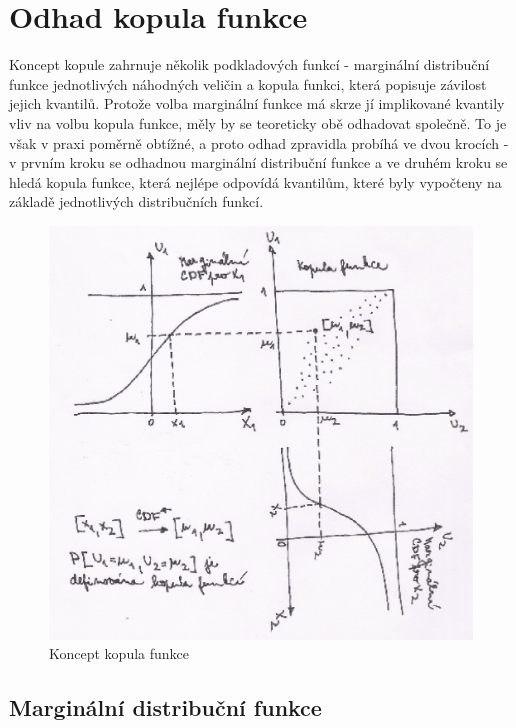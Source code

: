 \chapter{Odhad kopula funkce}

Koncept kopule zahrnuje několik podkladových funkcí - marginální distribuční funkce jednotlivých náhodných veličin a kopula funkci, která popisuje závilost jejich kvantilů. Protože volba marginální funkce má skrze jí implikované kvantily vliv na volbu kopula funkce, měly by se teoreticky obě odhadovat společně. To je však v praxi poměrně obtížné, a proto odhad zpravidla probíhá ve dvou krocích - v prvním kroku se odhadnou marginální distribuční funkce a ve druhém kroku se hledá kopula funkce, která nejlépe odpovídá kvantilům, které byly vypočteny na základě jednotlivých distribučních funkcí.

\begin{figure}[htp]
\centering
\includegraphics[scale = 0.50]{pictures/copula_concept.eps}
\caption{Koncept kopula funkce}
\end{figure}

\section{Marginální distribuční funkce}

